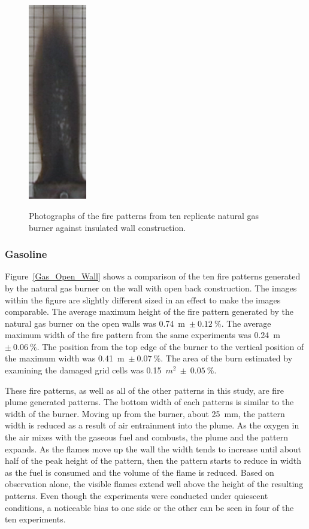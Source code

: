 \documentclass[twoside]{uocthesis}
\begin{document}
{\begin{figure}[p]
	\includegraphics[width=1.0in]{../Figures/GBNG33} \\

	\caption[Photographs of the fire patterns from ten replicate natural gas burner against insulated wall construction]{Photographs of the fire patterns from ten replicate natural gas burner against insulated wall construction.}
	\label{NG_Insulated_Wall}
\end{figure}

\subsubsection{Gasoline}

Figure~\ref{Gas_Open_Wall} shows a comparison of the ten fire patterns generated by the natural gas burner on the wall with open back construction.  The images within the figure are slightly different sized in an effect to make the images comparable.
The average maximum height of the fire pattern generated by the natural gas burner on the open walls was 0.74~m~$\pm~0.12~\%$.  The average maximum width of the fire pattern from the same experiments was 0.24~m~$\pm~0.06~\%$.  The position from the top edge of the burner to the vertical position of the maximum width was 0.41~m~$\pm~0.07~\%$. The area of the burn estimated by examining the damaged grid cells was 0.15~$m^2~\pm~0.05~\%$.  

These fire patterns, as well as all of the other patterns in this study, are fire plume generated patterns. The bottom width of each patterns is similar to the width of the burner. Moving up from the burner, about 25~mm, the pattern width is reduced as a result of air entrainment into the plume.  As the oxygen in the air mixes with the gaseous fuel and combusts, the plume and the pattern expands.  As the flames move up the wall the width tends to increase until about half of the peak height of the pattern, then the pattern starts to reduce in width as the fuel is consumed and the volume of the flame is reduced.  Based on observation alone, the visible flames extend well above the height of the resulting patterns.  Even though the experiments were conducted under quiescent conditions, a noticeable bias to one side or the other can be seen in four of the ten experiments.           

}
\end{document}
